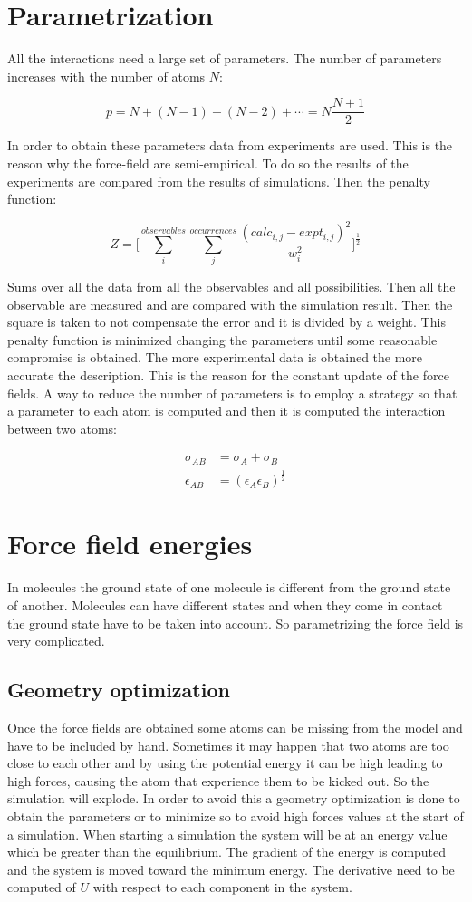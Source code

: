 \section{Parametrization}
All the interactions need a large set of parameters.
The number of parameters increases with the number of atoms $N$:

$$p = N + (N-1)+(N-2)+\cdots = N\frac{N+1}{2}$$

In order to obtain these parameters data from experiments are used.
This is the reason why the force-field are semi-empirical.
To do so the results of the experiments are compared from the results of simulations.
Then the penalty function:

$$Z = \biggl[\sum\limits_{i}^{observables}\sum\limits_{j}^{occurrences}\frac{(calc_{i,j}-expt_{i,j})^2}{w_i^2}\biggr]^{\frac{1}{2}}$$

Sums over all the data from all the observables and all possibilities.
Then all the observable are measured and are compared with the simulation result.
Then the square is taken to not compensate the error and it is divided by a weight.
This penalty function is minimized changing the parameters until some reasonable compromise is obtained.
The more experimental data is obtained the more accurate the description.
This is the reason for the constant update of the force fields.
A way to reduce the number of parameters is to employ a strategy so that a parameter to each atom is computed and then it is computed the interaction between two atoms:

\begin{align*}
	\sigma_{AB} &= \sigma_A+\sigma_B\\
	\epsilon_{AB} &= (\epsilon_A\epsilon_B)^{\frac{1}{2}}
\end{align*}

\section{Force field energies}
In molecules the ground state of one molecule is different from the ground state of another.
Molecules can have different states and when they come in contact the ground state have to be taken into account.
So parametrizing the force field is very complicated.

	\subsection{Geometry optimization}
	Once the force fields are obtained some atoms can be missing from the model and have to be included by hand.
	Sometimes it may happen that two atoms are too close to each other and by using the potential energy it can be high leading to high forces, causing the atom that experience them to be kicked out.
	So the simulation will explode.
	In order to avoid this a geometry optimization is done to obtain the parameters or to minimize so to avoid high forces values at the start of a simulation.
	When starting a simulation the system will be at an energy value which be greater than the equilibrium.
	The gradient of the energy is computed and the system is moved toward the minimum energy.
	The derivative need to be computed of $U$ with respect to each component in the system.

